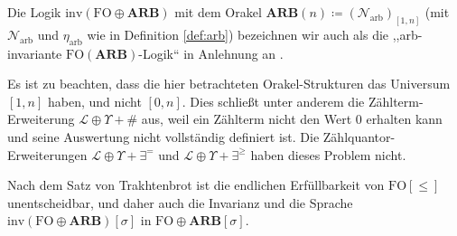\begin{notation}
Die Logik $\mathrm{inv}\left(\mathrm{FO}\oplus\mathbf{ARB}\right)$
mit dem Orakel $\mathbf{ARB}\left(n\right)\coloneqq\left(\mathcal{N}_{\mathrm{arb}}\right)_{\left[1,n\right]}$
(mit $\mathcal{N}_{\mathrm{arb}}$ und $\eta_{\mathrm{arb}}$ wie
in Definition \ref{def:arb}) bezeichnen wir auch als die ,,arb-invariante
$\mathrm{FO}\left(\mathbf{ARB}\right)$-Logik`` in Anlehnung an \cite{Schweikardt13ashort,AMSS2012-locality}.
\end{notation}
Es ist zu beachten, dass die hier betrachteten Orakel-Strukturen das
Universum $\left[1,n\right]$ haben, und nicht $\left[0,n\right]$.
Dies schließt unter anderem die Zählterm-Erweiterung $\mathcal{L}\oplus\Upsilon+\#$
aus, weil ein Zählterm nicht den Wert $0$ erhalten kann und seine
Auswertung nicht vollständig definiert ist. Die Zählquantor-Erweiterungen
$\mathcal{L}\oplus\Upsilon+\exists^{=}$ und $\mathcal{L}\oplus\Upsilon+\exists^{\geqslant}$
haben dieses Problem nicht.

Nach dem Satz von Trakhtenbrot ist die endlichen Erfüllbarkeit von
$\mathrm{FO}\left[\leqslant\right]$ unentscheidbar, und daher auch
die Invarianz und die Sprache $\mbox{inv}\left(\mathrm{FO}\oplus\mathbf{ARB}\right)\left[\sigma\right]$
in $\mathrm{FO}\oplus\mathbf{ARB}\left[\sigma\right]$.\cite{EbbinghausFlumThomas,Libkin2012,Schweikardt13ashort} 
